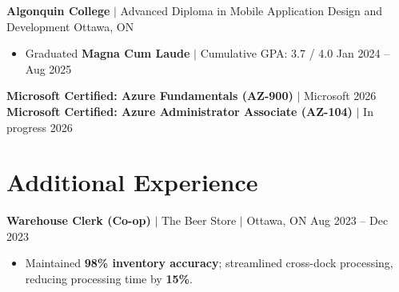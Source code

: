 \documentclass[11pt,a4paper]{article}
\begin{document}
\textbf{Algonquin College} $|$ Advanced Diploma in Mobile Application Design and Development \hfill Ottawa, ON
\begin{itemize}
    \item Graduated \textbf{Magna Cum Laude} $|$ Cumulative GPA: 3.7 / 4.0 \hfill Jan 2024 -- Aug 2025
\end{itemize}
\textbf{Microsoft Certified: Azure Fundamentals (AZ-900)} $|$ Microsoft \hfill 2026 \\
\textbf{Microsoft Certified: Azure Administrator Associate (AZ-104)} $|$ In progress \hfill 2026

\section{Additional Experience}

\textbf{Warehouse Clerk (Co-op)} $|$ The Beer Store $|$ Ottawa, ON \hfill Aug 2023 -- Dec 2023
\begin{itemize}
    \item Maintained \textbf{98\% inventory accuracy}; streamlined cross-dock processing, reducing processing time by \textbf{15\%}.
\end{itemize}
\end{document}
